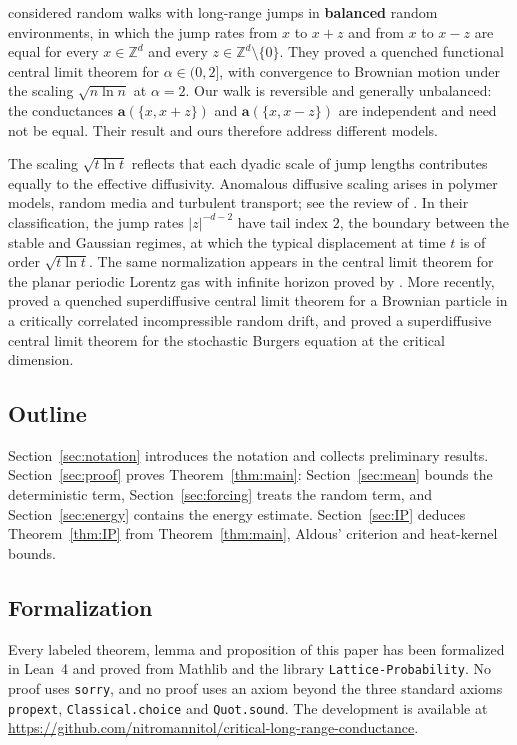 \documentclass[11pt]{amsart}
\numberwithin{equation}{section}
\newcommand{\Z}{\mathbb{Z}}
\newcommand{\ba}{\mathbf{a}}
\begin{document}
\citet*{CCKW2021} considered random walks with long-range jumps in \textbf{balanced} random environments, in which the jump rates from $x$ to $x+z$ and from $x$ to $x-z$ are equal for every $x \in \Z^d$ and every $z \in \Z^d \setminus \{0\}$.
They proved a quenched functional central limit theorem for $\alpha \in (0,2]$, with convergence to Brownian motion under the scaling $\sqrt{n \ln n}$ at $\alpha = 2$.
Our walk is reversible and generally unbalanced: the conductances $\ba(\{x,x+z\})$ and $\ba(\{x,x-z\})$ are independent and need not be equal.
Their result and ours therefore address different models.

The scaling $\sqrt{t \ln t}$ reflects that each dyadic scale of jump lengths contributes equally to the effective diffusivity.
Anomalous diffusive scaling arises in polymer models, random media and turbulent transport; see the review of \citet{BouchaudGeorges1990}.
In their classification, the jump rates $|z|^{-d-2}$ have tail index $2$, the boundary between the stable and Gaussian regimes, at which the typical displacement at time $t$ is of order $\sqrt{t \ln t}$.
The same normalization appears in the central limit theorem for the planar periodic Lorentz gas with infinite horizon proved by \citet{SzaszVarju2007}.
More recently, \citet*{ArmstrongBouRabeeKuusi2024} proved a quenched superdiffusive central limit theorem for a Brownian particle in a critically correlated incompressible random drift, and \citet*{CannizzaroMoulardToninelli2025} proved a superdiffusive central limit theorem for the stochastic Burgers equation at the critical dimension.

\subsection{Outline}

Section~\ref{sec:notation} introduces the notation and collects preliminary results.
Section~\ref{sec:proof} proves Theorem~\ref{thm:main}: Section~\ref{sec:mean} bounds the deterministic term, Section~\ref{sec:forcing} treats the random term, and Section~\ref{sec:energy} contains the energy estimate.
Section~\ref{sec:IP} deduces Theorem~\ref{thm:IP} from Theorem~\ref{thm:main}, Aldous' criterion and heat-kernel bounds.

\subsection{Formalization}\label{ssec:formalization}

\begin{sloppypar}
Every labeled theorem, lemma and proposition of this paper has been formalized in Lean~4 and proved from Mathlib and the library \texttt{Lattice-Probability}.
No proof uses \texttt{sorry}, and no proof uses an axiom beyond the three standard axioms \texttt{propext}, \texttt{Classical.choice} and \texttt{Quot.sound}.
The development is available at \url{https://github.com/nitromannitol/critical-long-range-conductance}.
\end{sloppypar}
\end{document}
